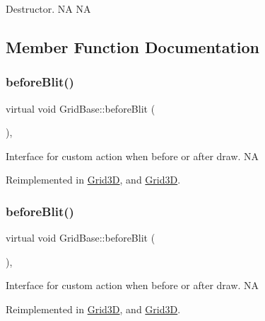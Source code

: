 Destructor.  NA  NA 

\subsection{Member Function Documentation}
\mbox{\label{classGridBase_a04ceef221be29f561d00bd10ae7dc13a}} 
\subsubsection{\texorpdfstring{before\+Blit()}{beforeBlit()}\hspace{0.1cm}{\footnotesize\ttfamily [1/2]}}
{\footnotesize\ttfamily virtual void Grid\+Base\+::before\+Blit (\begin{DoxyParamCaption}{ }\end{DoxyParamCaption})\hspace{0.3cm}{\ttfamily [inline]}, {\ttfamily [virtual]}}

Interface for custom action when before or after draw.  NA 

Reimplemented in \hyperlink{classGrid3D_a11850dd96447d34ae98b4d606177eee3}{Grid3D}, and \hyperlink{classGrid3D_a6f8b9946289014c187e645dd6de7974c}{Grid3D}.

\mbox{\label{classGridBase_a04ceef221be29f561d00bd10ae7dc13a}} 
\subsubsection{\texorpdfstring{before\+Blit()}{beforeBlit()}\hspace{0.1cm}{\footnotesize\ttfamily [2/2]}}
{\footnotesize\ttfamily virtual void Grid\+Base\+::before\+Blit (\begin{DoxyParamCaption}{ }\end{DoxyParamCaption})\hspace{0.3cm}{\ttfamily [inline]}, {\ttfamily [virtual]}}

Interface for custom action when before or after draw.  NA 

Reimplemented in \hyperlink{classGrid3D_a11850dd96447d34ae98b4d606177eee3}{Grid3D}, and \hyperlink{classGrid3D_a6f8b9946289014c187e645dd6de7974c}{Grid3D}.

